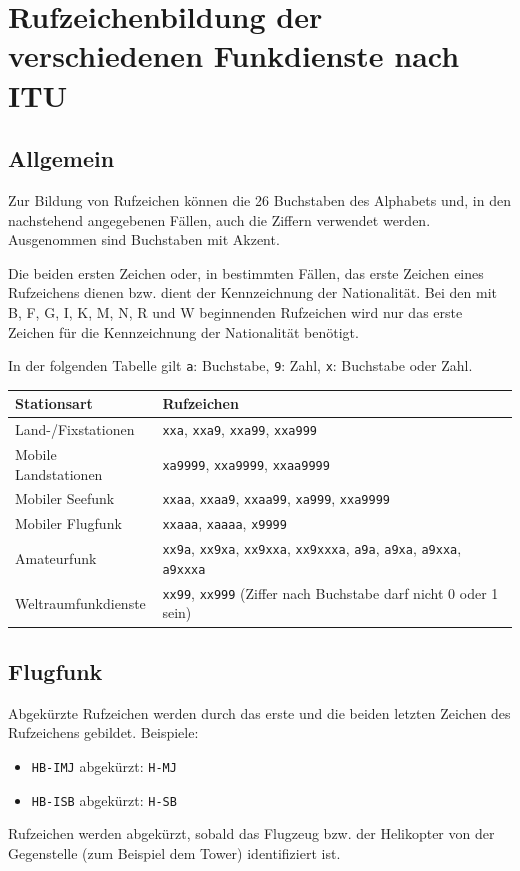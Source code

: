 {
\newcommand{\rz}[1]{\texttt{#1}}

\section{Rufzeichenbildung der verschiedenen Funkdienste nach ITU}
\subsection{Allgemein}
Zur Bildung von Rufzeichen können die 26 Buchstaben des Alphabets und, in den nachstehend angegebenen Fällen, auch die Ziffern verwendet werden. Ausgenommen sind Buchstaben mit Akzent.

Die beiden ersten Zeichen oder, in bestimmten Fällen, das erste Zeichen eines Rufzeichens dienen bzw. dient der Kennzeichnung der Nationalität. Bei den mit B, F, G, I, K, M, N, R und W beginnenden Rufzeichen wird nur das erste Zeichen für die Kennzeichnung der Nationalität benötigt.

In der folgenden Tabelle gilt \texttt{a}: Buchstabe, \texttt{9}: Zahl, \texttt{x}: Buchstabe oder Zahl.

\vspace{1em}
\noindent
\begin{tabular}{ll}
\bfseries Stationsart & \bfseries Rufzeichen \\ \toprule \arrayrulecolor{rowsep}
Land-/Fixstationen    & \rz{xxa}, \rz{xxa9}, \rz{xxa99}, \rz{xxa999} \\ \midrule
Mobile Landstationen  & \rz{xa9999}, \rz{xxa9999}, \rz{xxaa9999} \\ \midrule
Mobiler Seefunk       & \rz{xxaa}, \rz{xxaa9}, \rz{xxaa99}, \rz{xa999}, \rz{xxa9999} \\ \midrule
Mobiler Flugfunk      & \rz{xxaaa}, \rz{xaaaa}, \rz{x9999} \\ \midrule
Amateurfunk           & \rz{xx9a}, \rz{xx9xa}, \rz{xx9xxa}, \rz{xx9xxxa}, \rz{a9a}, \rz{a9xa}, \rz{a9xxa}, \rz{a9xxxa} \\ \midrule
Weltraumfunkdienste   & \rz{xx99}, \rz{xx999} (Ziffer nach Buchstabe darf nicht 0 oder 1 sein) \\ \midrule
\end{tabular}

\subsection{Flugfunk}
Abgekürzte Rufzeichen werden durch das erste und die beiden letzten Zeichen des Rufzeichens gebildet. Beispiele:
\begin{itemize}
 \item \rz{HB-IMJ} abgekürzt: \rz{H-MJ}
 \item \rz{HB-ISB} abgekürzt: \rz{H-SB}
\end{itemize}
Rufzeichen werden abgekürzt, sobald das Flugzeug bzw. der Helikopter von der Gegenstelle (zum Beispiel dem Tower) identifiziert ist. 

}

